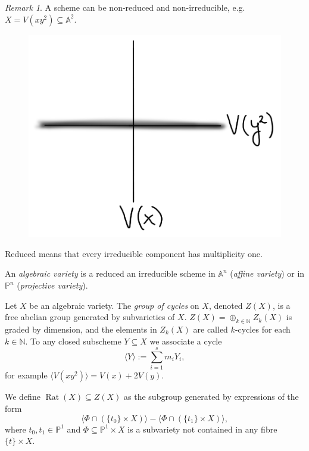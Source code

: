 \documentclass[12pt,a4paper]{amsart}
\theoremstyle{plain}
\theoremstyle{definition}
\theoremstyle{remark}
\newtheorem{rem}[thm]{Remark}
\begin{document}
\begin{rem}
    A scheme can be non-reduced and non-irreducible, e.g.~$X=V(xy^{2})\subseteq \mathbb{A}^{2}$.
    \begin{figure}[H]
	\centering
	\includegraphics[scale=.75]{pictures/schemeaxes}
    \end{figure}

    Reduced means that every irreducible component has multiplicity one.
\end{rem}

An \textit{algebraic variety} is a reduced an irreducible scheme in $\mathbb{A}^{n}$ (\textit{affine variety}) or in $\mathbb{P}^{n}$ (\textit{projective variety}).

Let $X$ be an algebraic variety.
The \textit{group of cycles} on $X$, denoted $Z(X)$, is a free abelian group generated by subvarieties of $X$.
$Z(X)=\oplus_{k\in \mathbb{N}}Z_{k}(X)$ is graded by dimension, and the elements in $Z_{k}(X)$ are called $k$-cycles for each $k\in \mathbb{N}$.
To any closed subscheme $Y\subseteq X$ we associate a cycle
\[ \langle Y\rangle :=\sum_{i=1}^{s}m_{i}Y_{i}, \]
for example $\langle V(xy^{2})\rangle = V(x)+2V(y)$.

We define $\operatorname{Rat}(X)\subseteq Z(X)$ as the subgroup generated by expressions of the form
\begin{equation}\label{eqn:2.1}
    \langle \Phi\cap (\{t_{0}\}\times X)\rangle - \langle \Phi\cap (\{t_{1}\}\times X)\rangle,
\end{equation}
where $t_{0},t_{1}\in \mathbb{P}^{1}$ and $\Phi\subseteq \mathbb{P}^{1}\times X$ is a subvariety not contained in any fibre $\{ t\}\times X$.
\end{document}
